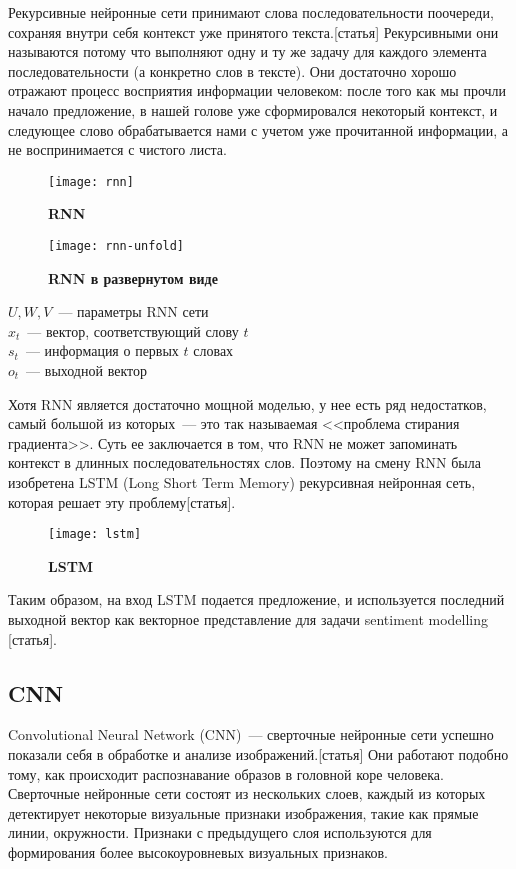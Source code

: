 Рекурсивные нейронные сети принимают слова последовательности поочереди, сохраняя внутри себя контекст уже принятого текста.[статья] Рекурсивными они называются потому что выполняют одну и ту же задачу для каждого элемента последовательности (а конкретно слов в тексте). Они достаточно хорошо отражают процесс восприятия информации человеком: после того как мы прочли начало предложение, в нашей голове уже сформировался некоторый контекст, и следующее слово обрабатывается нами с учетом уже прочитанной информации, а не воспринимается с чистого листа.

\begin{figure}[h]
\texttt{[image: rnn]}
\caption{\textbf{RNN}}
\label{fig:rnn}
\end{figure}

\begin{figure}[h]
\texttt{[image: rnn-unfold]}
\caption{\textbf{RNN в развернутом виде}}
\label{fig:rnn-unfold}
\end{figure}

\noindent $U, W, V$~--- параметры RNN сети\\
$x_t$~--- вектор, соответствующий слову $t$ \\
$s_t$~--- информация о первых $t$ словах \\
$o_t$~--- выходной вектор

Хотя RNN является достаточно мощной моделью, у нее есть ряд недостатков, самый большой из которых~--- это так называемая <<проблема стирания градиента>>. Суть ее заключается в том, что RNN не может запоминать контекст в длинных последовательностях слов. Поэтому на смену RNN была изобретена LSTM (Long Short Term Memory) рекурсивная нейронная сеть, которая решает эту проблему[статья].

\begin{figure}[h]
\texttt{[image: lstm]}
\caption{\textbf{LSTM}}
\label{fig:lstm}
\end{figure}

Таким образом, на вход LSTM подается предложение, и используется последний выходной вектор как векторное представление для задачи sentiment modelling [статья].

\subsection{CNN}
Convolutional Neural Network (CNN)~--- сверточные нейронные сети успешно показали себя в обработке и анализе изображений.[статья] Они работают подобно тому, как происходит распознавание образов в головной коре человека. Сверточные нейронные сети состоят из нескольких слоев, каждый из которых детектирует некоторые визуальные признаки изображения, такие как прямые линии, окружности. Признаки с предыдущего слоя используются для формирования более высокоуровневых визуальных признаков.

